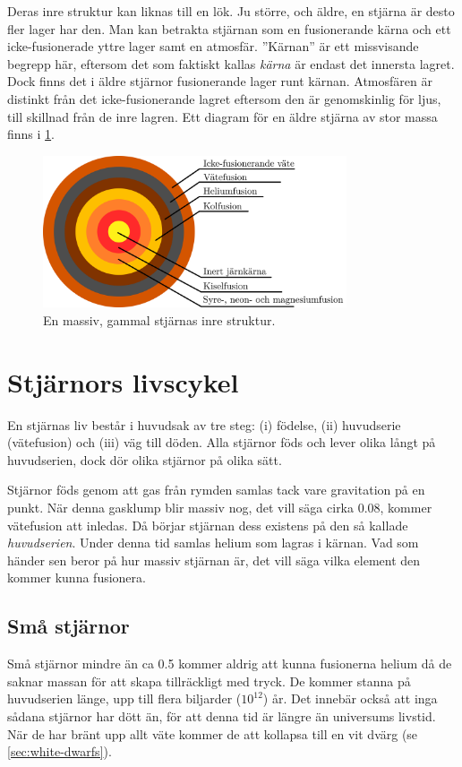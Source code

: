 Deras inre struktur kan liknas till en lök. Ju större, och äldre, en stjärna är desto fler lager har den. Man kan betrakta stjärnan som en fusionerande kärna och ett icke-fusionerade yttre lager samt en atmosfär. ''Kärnan'' är ett missvisande begrepp här, eftersom det som faktiskt kallas \emph{kärna} är endast det innersta lagret. Dock finns det i äldre stjärnor fusionerande lager runt kärnan. Atmosfären är distinkt från det icke-fusionerande lagret eftersom den är genomskinlig för ljus, till skillnad från de inre lagren. Ett diagram för en äldre stjärna av stor massa finns i \cref{fig:star-anatomy}.
\begin{figure}[h!]
    \centering
    \includegraphics[width=0.8\textwidth]{img/star.png}
    \caption{En massiv, gammal stjärnas inre struktur.}
    \label{fig:star-anatomy}
\end{figure}

\section{Stjärnors livscykel}
En stjärnas liv består i huvudsak av tre steg: (i) födelse, (ii) huvudserie (vätefusion) och (iii) väg till döden. Alla stjärnor föds och lever olika långt på huvudserien, dock dör olika stjärnor på olika sätt.

Stjärnor föds genom att gas från rymden samlas tack vare gravitation på en punkt. När denna gasklump blir massiv nog, det vill säga cirka \qty{0.08}{\Mo}, kommer vätefusion att inledas. Då börjar stjärnan dess existens på den så kallade \emph{huvudserien}. Under denna tid samlas helium som lagras i kärnan. Vad som händer sen beror på hur massiv stjärnan är, det vill säga vilka element den kommer kunna fusionera.

\subsection{Små stjärnor}
Små stjärnor mindre än ca \qty{0.5}{\Mo} kommer aldrig att kunna fusionerna helium då de saknar massan för att skapa tillräckligt med tryck. De kommer stanna på huvudserien länge, upp till flera biljarder ($10^{12}$) år. Det innebär också att inga sådana stjärnor har dött än, för att denna tid är längre än universums livstid. När de har bränt upp allt väte kommer de att kollapsa till en vit dvärg (se \vref{sec:white-dwarfs}).

